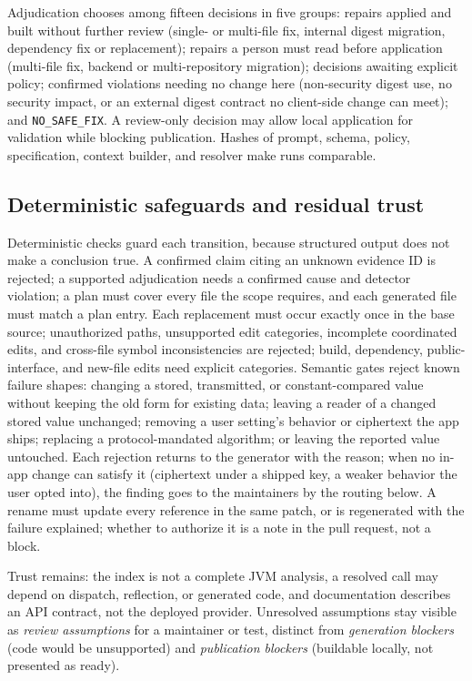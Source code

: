 \documentclass[conference]{IEEEtran}
\begin{document}
Adjudication chooses among fifteen decisions in five groups: repairs applied
and built without further review (single- or multi-file fix, internal digest
migration, dependency fix or replacement); repairs a person must read before
application (multi-file fix, backend or multi-repository migration); decisions
awaiting explicit policy; confirmed violations needing no change here
(non-security digest use, no security impact, or an external digest contract
no client-side change can meet); and \texttt{NO\_SAFE\_FIX}. A review-only
decision may allow local application for validation while blocking
publication. Hashes of prompt, schema, policy, specification, context builder,
and resolver make runs comparable.

\subsection{Deterministic safeguards and residual trust}

Deterministic checks guard each transition, because structured output does not
make a conclusion true. A confirmed claim citing an unknown evidence ID is
rejected; a supported adjudication needs a confirmed cause and detector
violation; a plan must cover every file the scope requires, and each generated
file must match a plan entry. Each replacement must occur exactly once in the
base source; unauthorized paths, unsupported edit categories, incomplete
coordinated edits, and cross-file symbol inconsistencies are rejected; build,
dependency, public-interface, and new-file edits need explicit categories.
Semantic gates reject known failure shapes: changing a stored, transmitted, or
constant-compared value without keeping the old form for existing data; leaving
a reader of a changed stored value unchanged; removing a user setting's
behavior or ciphertext the app ships; replacing a protocol-mandated algorithm;
or leaving the reported value untouched. Each rejection returns to the
generator with the reason; when no in-app change can satisfy it (ciphertext
under a shipped key, a weaker behavior the user opted into), the finding goes
to the maintainers by the routing below. A rename must update every reference
in the same patch, or is regenerated with the failure explained; whether to
authorize it is a note in the pull request, not a block.

Trust remains: the index is not a complete JVM analysis, a resolved call may
depend on dispatch, reflection, or generated code, and documentation describes
an API contract, not the deployed provider. Unresolved assumptions stay
visible as \emph{review assumptions} for a maintainer or test, distinct from
\emph{generation blockers} (code would be unsupported) and \emph{publication
blockers} (buildable locally, not presented as ready).
\end{document}
